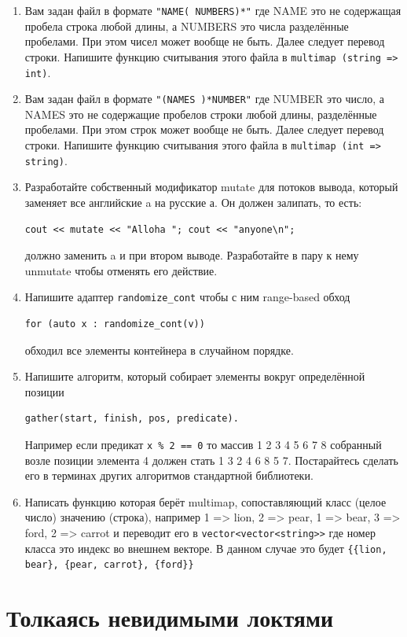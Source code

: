 \documentclass[a4paper,12pt,oneside]{book}
\begin{document}
\begin{enumerate}
\item 
Вам задан файл в формате \lstinline!"NAME( NUMBERS)*"! где NAME это не содержащая пробела строка любой длины, а NUMBERS это числа разделённые пробелами. При этом чисел может вообще не быть. Далее следует перевод строки. Напишите функцию считывания этого файла в \lstinline!multimap (string => int)!.
\item 
Вам задан файл в формате \lstinline!"(NAMES )*NUMBER"! где NUMBER это число, а NAMES это не содержащие пробелов строки любой длины, разделённые пробелами. При этом строк может вообще не быть. Далее следует перевод строки. Напишите функцию считывания этого файла в \lstinline!multimap (int => string)!.
\item 
Разработайте собственный модификатор mutate для потоков вывода, который заменяет все английские a на русские а. Он должен залипать, то есть:
\begin{lstlisting}
cout << mutate << "Alloha "; cout << "anyone\n"; 
\end{lstlisting}
должно заменить a и при втором выводе. Разработайте в пару к нему unmutate чтобы отменять его действие.
\item 
Напишите адаптер \lstinline!randomize_cont! чтобы с ним range-based обход 
\begin{lstlisting}
for (auto x : randomize_cont(v)) 
\end{lstlisting}
обходил все элементы контейнера в случайном порядке.
\item 
Напишите алгоритм, который собирает элементы вокруг определённой позиции 
\begin{lstlisting}
gather(start, finish, pos, predicate). 
\end{lstlisting}
Например если предикат \lstinline!x % 2 == 0! то массив 1 2 3 4 5 6 7 8 собранный возле позиции элемента 4 должен стать 1 3 2 4 6 8 5 7. Постарайтесь сделать его в терминах других алгоритмов стандартной библиотеки.
\item 
Написать функцию которая берёт multimap, сопоставляющий класс (целое число) значению (строка), например 
1 => lion, 2 => pear, 1 => bear, 3 => ford, 2 => carrot 
и переводит его в \lstinline!vector<vector<string>>! где номер класса это индекс во внешнем векторе. В данном случае это будет \lstinline!{{lion, bear}, {pear, carrot}, {ford}}!
\end{enumerate}

\pagebreak
\chapter{Толкаясь невидимыми локтями}\label{chap:mt}
\end{document}
